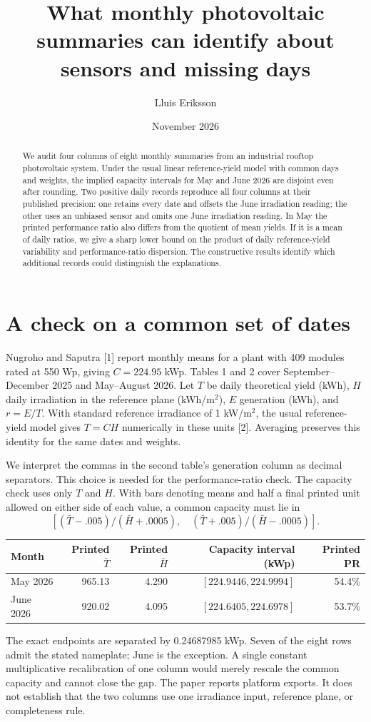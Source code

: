\documentclass[10pt]{article}
\title{What monthly photovoltaic summaries can identify about sensors and missing days}
\author{Lluis Eriksson}
\date{November 2026}
\begin{document}
\maketitle
\begin{abstract}
We audit four columns of eight monthly summaries from an industrial rooftop photovoltaic system. Under the usual linear reference-yield model with common days and weights, the implied capacity intervals for May and June 2026 are disjoint even after rounding. Two positive daily records reproduce all four columns at their published precision: one retains every date and offsets the June irradiation reading; the other uses an unbiased sensor and omits one June irradiation reading. In May the printed performance ratio also differs from the quotient of mean yields. If it is a mean of daily ratios, we give a sharp lower bound on the product of daily reference-yield variability and performance-ratio dispersion. The constructive results identify which additional records could distinguish the explanations.
\end{abstract}
\section{A check on a common set of dates}
Nugroho and Saputra [1] report monthly means for a plant with 409 modules rated at 550 Wp, giving $C=224.95$ kWp. Tables 1 and 2 cover September--December 2025 and May--August 2026. Let $T$ be daily theoretical yield (kWh), $H$ daily irradiation in the reference plane (kWh/m$^2$), $E$ generation (kWh), and $r=E/T$. With standard reference irradiance of 1 kW/m$^2$, the usual reference-yield model gives $T=C H$ numerically in these units [2]. Averaging preserves this identity for the same dates and weights.

We interpret the commas in the second table's generation column as decimal separators. This choice is needed for the performance-ratio check. The capacity check uses only $T$ and $H$. With bars denoting means and half a final printed unit allowed on either side of each value, a common capacity must lie in
\[
\left[(\bar T-.005)/(\bar H+.0005),\quad(\bar T+.005)/(\bar H-.0005)\right].
\]
\begin{center}\begin{tabular}{lrrrr}\toprule
Month & Printed $\bar T$ & Printed $\bar H$ & Capacity interval (kWp) & Printed PR\\\midrule
May 2026 & 965.13 & 4.290 & $[224.9446,224.9994]$ & 54.4\%\\
June 2026 & 920.02 & 4.095 & $[224.6405,224.6978]$ & 53.7\%\\\bottomrule
\end{tabular}\end{center}
The exact endpoints are separated by 0.24687985 kWp. Seven of the eight rows admit the stated nameplate; June is the exception. A single constant multiplicative recalibration of one column would merely rescale the common capacity and cannot close the gap. The paper reports platform exports. It does not establish that the two columns use one irradiance input, reference plane, or completeness rule.
\newpage
\end{document}

